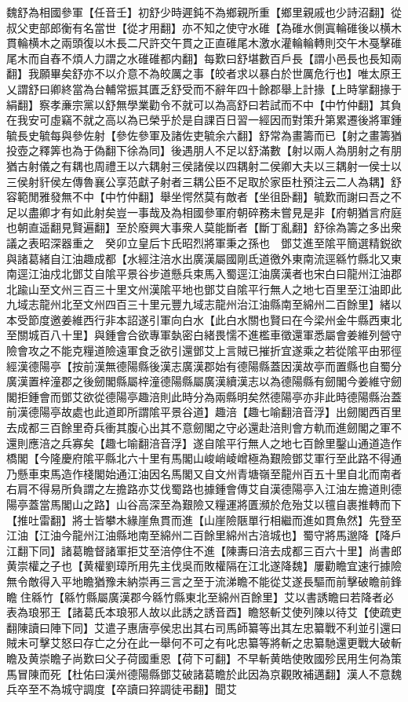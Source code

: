 魏舒為相國參軍【任音壬】初舒少時遲鈍不為鄉親所重【鄉里親戚也少詩沼翻】從叔父吏部郎衡有名當世【從才用翻】亦不知之使守水碓【為碓水側寘輪碓後以横木貫輪横木之兩頭復以木長二尺許交午貫之正直碓尾木激水灌輪輪轉則交午木戞擊碓尾木而自舂不煩人力謂之水碓碓都内翻】每歎曰舒堪數百戶長【謂小邑長也長知兩翻】我願畢矣舒亦不以介意不為皎厲之事【皎者求以暴白於世厲危行也】唯太原王乂謂舒曰卿終當為台輔常振其匱乏舒受而不辭年四十餘郡舉上計掾【上時掌翻掾于絹翻】察孝亷宗黨以舒無學業勸令不就可以為高舒曰若試而不中【中竹仲翻】其負在我安可虛竊不就之高以為已榮乎於是自課百日習一經因而對策升第累遷後將軍鍾毓長史毓每與參佐射【參佐參軍及諸佐吏毓余六翻】舒常為畫籌而已【射之畫籌猶投壺之釋筭也為于偽翻下徐為同】後遇朋人不足以舒滿數【射以兩人為朋射之有朋猶古射儀之有耦也周禮王以六耦射三侯諸侯以四耦射二侯卿大夫以三耦射一侯士以三侯射豻侯左傳魯襄公享范獻子射者三耦公臣不足取於家臣杜預注云二人為耦】舒容範閒雅發無不中【中竹仲翻】舉坐愕然莫有敵者【坐徂卧翻】毓歎而謝曰吾之不足以盡卿才有如此射矣豈一事哉及為相國參軍府朝碎務未嘗見是非【府朝猶言府庭也朝直遥翻見賢遍翻】至於廢興大事衆人莫能斷者【斷丁亂翻】舒徐為籌之多出衆議之表昭深器重之　癸卯立皇后卞氏昭烈將軍秉之孫也　鄧艾進至隂平簡選精鋭欲與諸葛緒自江油趣成都【水經注涪水出廣漢屬國剛氐道徼外東南流逕緜竹縣北又東南逕江油戍北鄧艾自隂平景谷步道懸兵束馬入蜀逕江油廣漢者也宋白曰龍州江油郡北踰山至文州三百三十里文州漢隂平地也鄧艾自隂平行無人之地七百里至江油即此九域志龍州北至文州四百三十里元豐九域志龍州治江油縣南至綿州二百餘里】緒以本受節度邀姜維西行非本詔遂引軍向白水【此白水關也賢曰在今梁州金牛縣西東北至關城百八十里】與鍾會合欲專軍埶密白緒畏懦不進檻車徵還軍悉屬會姜維列營守險會攻之不能克糧道險遠軍食乏欲引還鄧艾上言賊已摧折宜遂乘之若從隂平由邪徑經漢德陽亭【按前漢無德陽縣後漢志廣漢郡始有德陽縣蓋因漢故亭而置縣也自蜀分廣漢置梓潼郡之後劒閣縣屬梓潼德陽縣屬廣漢續漢志以為德陽縣有劒閣今姜維守劒閣拒鍾會而鄧艾欲從德陽亭趣涪則此時分為兩縣明矣然德陽亭亦非此時德陽縣治蓋前漢德陽亭故處也此道即所謂隂平景谷道】趣涪【趣七喻翻涪音浮】出劒閣西百里去成都三百餘里奇兵衝其腹心出其不意劒閣之守必還赴涪則會方軌而進劒閣之軍不還則應涪之兵寡矣【趣七喻翻涪音浮】遂自隂平行無人之地七百餘里鑿山通道造作橋閣【今隆慶府隂平縣北六十里有馬閣山峻峭崚嶒極為艱險鄧艾軍行至此路不得通乃懸車束馬造作棧閣始通江油因名馬閣又自文州青塘嶺至龍州百五十里自北而南者右肩不得易所負謂之左擔路亦艾伐蜀路也據鍾會傳艾自漢德陽亭入江油左擔道則德陽亭蓋當馬閣山之路】山谷高深至為艱險又糧運將匱瀕於危殆艾以氊自裹推轉而下【推吐雷翻】將士皆攀木緣崖魚貫而進【山崖險陿單行相繼而進如貫魚然】先登至江油【江油今龍州江油縣地南至綿州二百餘里綿州古涪城也】蜀守將馬邈降【降戶江翻下同】諸葛瞻督諸軍拒艾至涪停住不進【陳夀曰涪去成都三百六十里】尚書郎黄崇權之子也【黄權劉璋所用先主伐吳而敗權隔在江北遂降魏】屢勸瞻宜速行據險無令敵得入平地瞻猶豫未納崇再三言之至于流涕瞻不能從艾遂長驅而前擊破瞻前鋒瞻住緜竹【緜竹縣屬廣漢郡今緜竹縣東北至綿州百餘里】艾以書誘瞻曰若降者必表為琅邪王【諸葛氏本琅邪人故以此誘之誘音酉】瞻怒斬艾使列陳以待艾【使疏吏翻陳讀曰陣下同】艾遣子惠唐亭侯忠出其右司馬師纂等出其左忠纂戰不利並引還曰賊未可擊艾怒曰存亡之分在此一舉何不可之有叱忠纂等將斬之忠纂馳還更戰大破斬瞻及黄崇瞻子尚歎曰父子荷國重恩【荷下可翻】不早斬黄皓使敗國殄民用生何為策馬冒陳而死【杜佑曰漢州德陽縣鄧艾破諸葛瞻於此因為京觀敗補邁翻】漢人不意魏兵卒至不為城守調度【卒讀曰猝調徒弔翻】聞艾